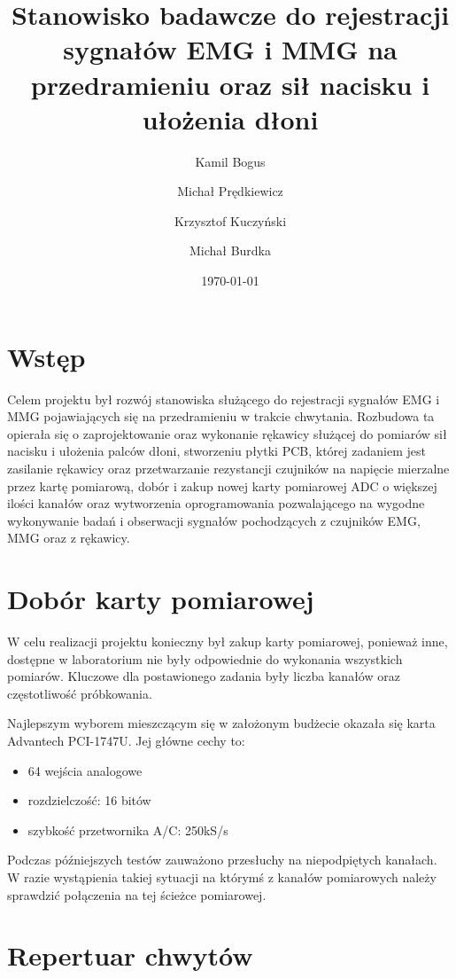 \documentclass[10pt, a4paper]{article}
\author{Kamil Bogus
\and 
Michał Prędkiewicz
\and
Krzysztof Kuczyński
\and
Michał Burdka
}
\title{Stanowisko badawcze do rejestracji sygnałów EMG i MMG na przedramieniu oraz sił nacisku i ułożenia dłoni}
\date{\today}
\begin{document}
\maketitle %
%
\def\tablename{Tabela}
%

\section{Wstęp}
\label{sec:wstep} %
%
Celem projektu był rozwój stanowiska służącego do rejestracji sygnałów EMG i MMG pojawiających się na przedramieniu w trakcie chwytania. Rozbudowa ta opierała się o zaprojektowanie oraz wykonanie rękawicy służącej do pomiarów sił nacisku i ułożenia palców dłoni, stworzeniu płytki PCB, której zadaniem jest zasilanie rękawicy oraz przetwarzanie rezystancji czujników na napięcie mierzalne przez kartę pomiarową, dobór i zakup nowej karty pomiarowej ADC o większej ilości kanałów oraz wytworzenia oprogramowania pozwalającego na wygodne wykonywanie badań i obserwacji sygnałów pochodzących z czujników EMG, MMG oraz z rękawicy.

\section{Dobór karty pomiarowej}
\label{sec:karta}

W celu realizacji projektu konieczny był zakup karty pomiarowej, ponieważ inne, dostępne w laboratorium nie były odpowiednie do wykonania wszystkich pomiarów. Kluczowe dla postawionego zadania były liczba kanałów oraz częstotliwość próbkowania.

Najlepszym wyborem mieszczącym się w założonym budżecie okazała się karta Advantech PCI-1747U. Jej główne cechy to:
\begin{itemize}
\item 64 wejścia analogowe
\item rozdzielczość: 16 bitów
\item szybkość przetwornika A/C: 250kS/s
\end{itemize}

Podczas późniejszych testów zauważono przesłuchy na niepodpiętych kanałach. W razie wystąpienia takiej sytuacji na którymś z kanałów pomiarowych należy sprawdzić połączenia na tej ścieżce pomiarowej.

\section{Repertuar chwytów}
\label{sec:chwyty}
\end{document}
